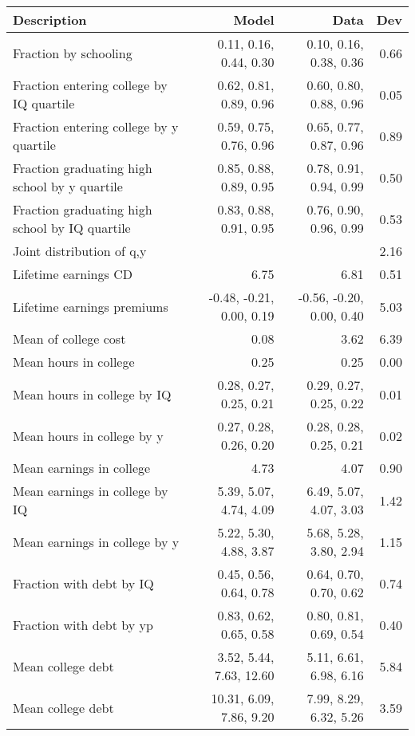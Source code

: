 \begin{tabular}{lrrr}
\hline
Description & Model  & Data  & Dev  \\ 
\hline
Fraction by schooling & 0.11, 0.16, 0.44, 0.30  & 0.10, 0.16, 0.38, 0.36  & 0.66  \\ 
Fraction entering college by IQ quartile & 0.62, 0.81, 0.89, 0.96  & 0.60, 0.80, 0.88, 0.96  & 0.05  \\ 
Fraction entering college by y quartile & 0.59, 0.75, 0.76, 0.96  & 0.65, 0.77, 0.87, 0.96  & 0.89  \\ 
Fraction graduating high school by y quartile & 0.85, 0.88, 0.89, 0.95  & 0.78, 0.91, 0.94, 0.99  & 0.50  \\ 
Fraction graduating high school by IQ quartile & 0.83, 0.88, 0.91, 0.95  & 0.76, 0.90, 0.96, 0.99  & 0.53  \\ 
Joint distribution of q,y &   &   & 2.16  \\ 
Lifetime earnings CD & 6.75  & 6.81  & 0.51  \\ 
Lifetime earnings premiums & -0.48, -0.21, 0.00, 0.19  & -0.56, -0.20, 0.00, 0.40  & 5.03  \\ 
Mean of college cost & 0.08  & 3.62  & 6.39  \\ 
Mean hours in college & 0.25  & 0.25  & 0.00  \\ 
Mean hours in college by IQ & 0.28, 0.27, 0.25, 0.21  & 0.29, 0.27, 0.25, 0.22  & 0.01  \\ 
Mean hours in college by y & 0.27, 0.28, 0.26, 0.20  & 0.28, 0.28, 0.25, 0.21  & 0.02  \\ 
Mean earnings in college & 4.73  & 4.07  & 0.90  \\ 
Mean earnings in college by IQ & 5.39, 5.07, 4.74, 4.09  & 6.49, 5.07, 4.07, 3.03  & 1.42  \\ 
Mean earnings in college by y & 5.22, 5.30, 4.88, 3.87  & 5.68, 5.28, 3.80, 2.94  & 1.15  \\ 
Fraction with debt by IQ & 0.45, 0.56, 0.64, 0.78  & 0.64, 0.70, 0.70, 0.62  & 0.74  \\ 
Fraction with debt by yp & 0.83, 0.62, 0.65, 0.58  & 0.80, 0.81, 0.69, 0.54  & 0.40  \\ 
Mean college debt & 3.52, 5.44, 7.63, 12.60  & 5.11, 6.61, 6.98, 6.16  & 5.84  \\ 
Mean college debt & 10.31, 6.09, 7.86, 9.20  & 7.99, 8.29, 6.32, 5.26  & 3.59  \\ 
\hline
\end{tabular}%
